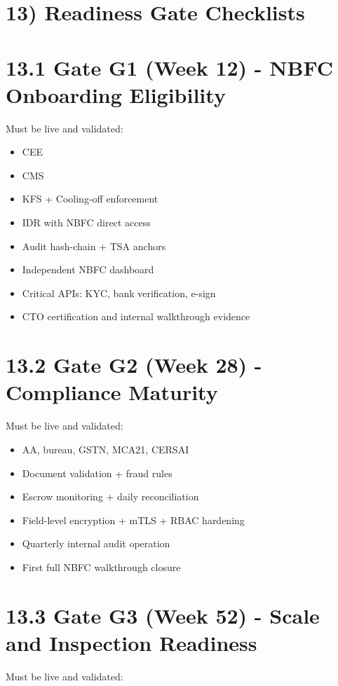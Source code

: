 ﻿\documentclass[12pt]{article}
\begin{document}
\section{13) Readiness Gate Checklists}


\section{13.1 Gate G1 (Week 12) - NBFC Onboarding Eligibility}


Must be live and validated:

\begin{itemize}
\item CEE
\item CMS
\item KFS + Cooling-off enforcement
\item IDR with NBFC direct access
\item Audit hash-chain + TSA anchors
\item Independent NBFC dashboard
\item Critical APIs: KYC, bank verification, e-sign
\item CTO certification and internal walkthrough evidence
\end{itemize}

\section{13.2 Gate G2 (Week 28) - Compliance Maturity}


Must be live and validated:

\begin{itemize}
\item AA, bureau, GSTN, MCA21, CERSAI
\item Document validation + fraud rules
\item Escrow monitoring + daily reconciliation
\item Field-level encryption + mTLS + RBAC hardening
\item Quarterly internal audit operation
\item First full NBFC walkthrough closure
\end{itemize}

\section{13.3 Gate G3 (Week 52) - Scale and Inspection Readiness}


Must be live and validated:
\end{document}

